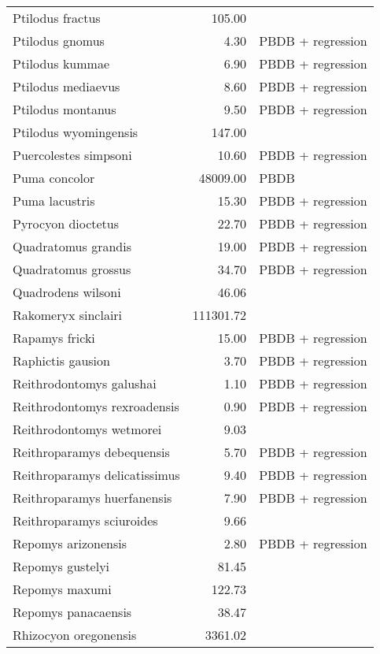 \begin{table}[ht]
\begin{tabular}{lrl}
  Ptilodus fractus & 105.00 & \cite{Wilson2012} \\ 
  Ptilodus gnomus & 4.30 & PBDB + regression \\ 
  Ptilodus kummae & 6.90 & PBDB + regression \\ 
  Ptilodus mediaevus & 8.60 & PBDB + regression \\ 
  Ptilodus montanus & 9.50 & PBDB + regression \\ 
  Ptilodus wyomingensis & 147.00 & \cite{Wilson2012} \\ 
  Puercolestes simpsoni & 10.60 & PBDB + regression \\ 
  Puma concolor & 48009.00 & PBDB \\ 
  Puma lacustris & 15.30 & PBDB + regression \\ 
  Pyrocyon dioctetus & 22.70 & PBDB + regression \\ 
  Quadratomus grandis & 19.00 & PBDB + regression \\ 
  Quadratomus grossus & 34.70 & PBDB + regression \\ 
  Quadrodens wilsoni & 46.06 & \cite{Tomiya2013} \\ 
  Rakomeryx sinclairi & 111301.72 & \cite{Tomiya2013} \\ 
  Rapamys fricki & 15.00 & PBDB + regression \\ 
  Raphictis gausion & 3.70 & PBDB + regression \\ 
  Reithrodontomys galushai & 1.10 & PBDB + regression \\ 
  Reithrodontomys rexroadensis & 0.90 & PBDB + regression \\ 
  Reithrodontomys wetmorei & 9.03 & \cite{Tomiya2013} \\ 
  Reithroparamys debequensis & 5.70 & PBDB + regression \\ 
  Reithroparamys delicatissimus & 9.40 & PBDB + regression \\ 
  Reithroparamys huerfanensis & 7.90 & PBDB + regression \\ 
  Reithroparamys sciuroides & 9.66 & \cite{Wang1994a} \\ 
  Repomys arizonensis & 2.80 & PBDB + regression \\ 
  Repomys gustelyi & 81.45 & \cite{Tomiya2013} \\ 
  Repomys maxumi & 122.73 & \cite{Tomiya2013} \\ 
  Repomys panacaensis & 38.47 & \cite{Tomiya2013} \\ 
  Rhizocyon oregonensis & 3361.02 & \cite{Tomiya2013} \\ 

\end{tabular}
\end{table}
